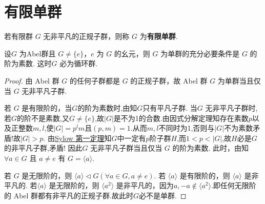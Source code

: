 \documentclass[../../main.tex]{subfiles}%
\begin{document}
\section{有限单群}

\begin{definition}[有限单群]
若有限群 \( G \) 无非平凡的正规子群，则称 \( G \) 为\textbf{有限单群}.
\end{definition}

\begin{theorem}\label{theorem:抽象代数--定理4.4.1}
设\( G \) 为Abel群且 \( G \neq \{e\} \)，\( e \) 为 \( G \) 的幺元，则 \( G \) 为单群的充分必要条件是 \( G \) 的阶为素数. 这时\( G \) 必为循环群.
\end{theorem}
\begin{proof}
由 Abel 群 \( G \) 的任何子群都是 \( G \) 的正规子群，故 Abel 群 \( G \) 为单群当且仅当 \( G \) 无非平凡子群. 

若 \( G \) 是有限阶的，当$G$的阶为素数时,由知$G$只有平凡子群.
当\( G \) 无非平凡子群时,若$G$的阶不是素数,又$G\neq \{e\}$,故$|G|$是不为1的合数.由因式分解定理知存在素数$p$以及正整数$m,l$,使$|G|=p^lm$且$(p,m)=1.$从而$m,l$不同时为1,否则与$|G|$不为素数矛盾!故$|G|>p$.
由\hyperref[theorem:Sylow 第一定理]{Sylow 第一定理}知$G$中一定有$p$阶子群$H$,而$1<p<|G|$,故$H$必是$G$的非平凡子群,矛盾!
因此\( G \) 无非平凡子群当且仅当 \( G \) 的阶为素数. 此时，由知\( \forall a \in G \) 且 \( a \neq e \) 有 \( G = \langle a \rangle \). 

若 \( G \) 是无限阶的，则 \( \langle a \rangle \lhd G (\forall a \in G, a \neq e) \). 若 \( \langle a \rangle \) 是有限阶的，则 \( \langle a \rangle \) 是非平凡的. 若\( \langle a \rangle \) 是无限阶的，则 \( \langle a^2 \rangle \) 是非平凡的，因为$a,-a\notin \langle a^2 \rangle$.即任何无限阶的 Abel 群都有非平凡的正规子群.故此时$G$必不是单群.
\end{proof}
\end{document}

